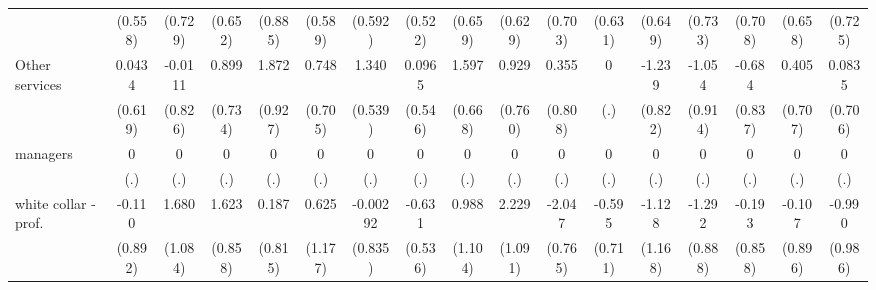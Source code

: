 {\begin{tabular}{l*{16}{c}}
                    &     (0.558)         &     (0.729)         &     (0.652)         &     (0.885)         &     (0.589)         &     (0.592)         &     (0.522)         &     (0.659)         &     (0.629)         &     (0.703)         &     (0.631)         &     (0.649)         &     (0.733)         &     (0.708)         &     (0.658)         &     (0.725)         \\
[1em]
Other services      &      0.0434         &     -0.0111         &       0.899         &       1.872\sym{*}  &       0.748         &       1.340\sym{*}  &      0.0965         &       1.597\sym{*}  &       0.929         &       0.355         &           0         &      -1.239         &      -1.054         &      -0.684         &       0.405         &      0.0835         \\
                    &     (0.619)         &     (0.826)         &     (0.734)         &     (0.927)         &     (0.705)         &     (0.539)         &     (0.546)         &     (0.668)         &     (0.760)         &     (0.808)         &         (.)         &     (0.822)         &     (0.914)         &     (0.837)         &     (0.707)         &     (0.706)         \\
[1em]
managers            &           0         &           0         &           0         &           0         &           0         &           0         &           0         &           0         &           0         &           0         &           0         &           0         &           0         &           0         &           0         &           0         \\
                    &         (.)         &         (.)         &         (.)         &         (.)         &         (.)         &         (.)         &         (.)         &         (.)         &         (.)         &         (.)         &         (.)         &         (.)         &         (.)         &         (.)         &         (.)         &         (.)         \\
[1em]
white collar - prof.&      -0.110         &       1.680         &       1.623         &       0.187         &       0.625         &    -0.00292         &      -0.631         &       0.988         &       2.229\sym{*}  &      -2.047\sym{**} &      -0.595         &      -1.128         &      -1.292         &      -0.193         &      -0.107         &      -0.990         \\
                    &     (0.892)         &     (1.084)         &     (0.858)         &     (0.815)         &     (1.177)         &     (0.835)         &     (0.536)         &     (1.104)         &     (1.091)         &     (0.765)         &     (0.711)         &     (1.168)         &     (0.888)         &     (0.858)         &     (0.896)         &     (0.986)         \\

\end{tabular}}
